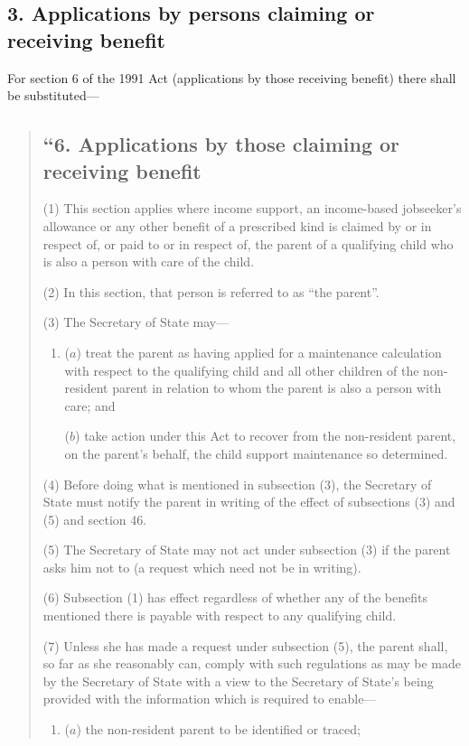\documentclass[12pt,a4paper]{article}
\begin{document}

\subsection{3. Applications by persons claiming or receiving benefit}

For section 6 of the 1991 Act (applications by those receiving benefit) there shall be substituted—
\begin{quotation}
\subsection*{“6. Applications by those claiming or receiving benefit}

(1) This section applies where income support, an income-based jobseeker’s allowance or any other benefit of a prescribed kind is claimed by or in respect of, or paid to or in respect of, the parent of a qualifying child who is also a person with care of the child.

(2) In this section, that person is referred to as “the parent”.

(3) The Secretary of State may—
\begin{enumerate}\item[]
($a$) treat the parent as having applied for a maintenance calculation with respect to the qualifying child and all other children of the non-resident parent in relation to whom the parent is also a person with care; and

($b$) take action under this Act to recover from the non-resident parent, on the parent’s behalf, the child support maintenance so determined.
\end{enumerate}

(4) Before doing what is mentioned in subsection (3), the Secretary of State must notify the parent in writing of the effect of subsections (3)  and (5)  and section 46. 

(5) The Secretary of State may not act under subsection (3)  if the parent asks him not to (a request which need not be in writing).

(6) Subsection (1)  has effect regardless of whether any of the benefits mentioned there is payable with respect to any qualifying child.

(7) Unless she has made a request under subsection (5), the parent shall, so far as she reasonably can, comply with such regulations as may be made by the Secretary of State with a view to the Secretary of State’s being provided with the information which is required to enable—
\begin{enumerate}\item[]
($a$) the non-resident parent to be identified or traced;


\end{enumerate}
\end{quotation}
\end{document}
